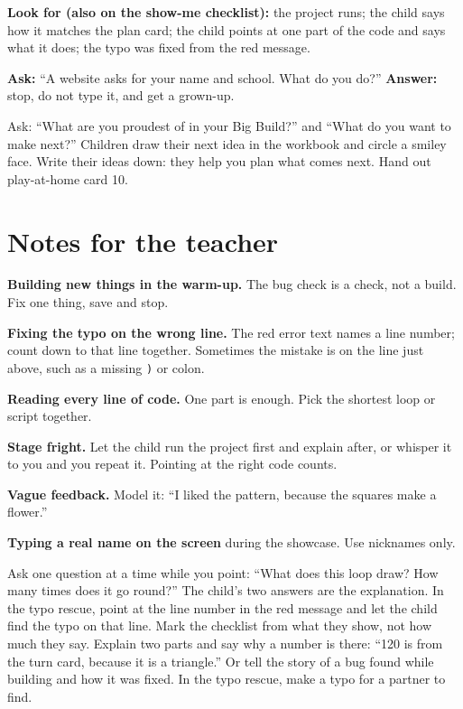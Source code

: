 \begin{formativecheck}
\textbf{Look for (also on the show-me checklist):} the project runs; the child says how it matches the plan card; the child points at one part of the code and says what it does; the typo was fixed from the red message.

\textbf{Ask:} \enquote{A website asks for your name and school. What do you do?}
\textbf{Answer:} stop, do not type it, and get a grown-up.
\end{formativecheck}

\begin{reflection}
Ask: \enquote{What are you proudest of in your Big Build?} and \enquote{What do you want to make next?} Children draw their next idea in the workbook and circle a smiley face. Write their ideas down: they help you plan what comes next. Hand out play-at-home card 10.
\end{reflection}

\section{Notes for the teacher}
\begin{commonmistakes}
  \item \textbf{Building new things in the warm-up.} The bug check is a check, not a build. Fix one thing, save and stop.
  \item \textbf{Fixing the typo on the wrong line.} The red error text names a line number; count down to that line together. Sometimes the mistake is on the line just above, such as a missing \texttt{)} or colon.
  \item \textbf{Reading every line of code.} One part is enough. Pick the shortest loop or script together.
  \item \textbf{Stage fright.} Let the child run the project first and explain after, or whisper it to you and you repeat it. Pointing at the right code counts.
  \item \textbf{Vague feedback.} Model it: \enquote{I liked the pattern, because the squares make a flower.}
  \item \textbf{Typing a real name on the screen} during the showcase. Use nicknames only.
\end{commonmistakes}

\begin{differentiation}
\supportpath Ask one question at a time while you point: \enquote{What does this loop draw? How many times does it go round?} The child's two answers are the explanation. In the typo rescue, point at the line number in the red message and let the child find the typo on that line. Mark the checklist from what they show, not how much they say.
\extensionpath Explain two parts and say why a number is there: \enquote{120 is from the turn card, because it is a triangle.} Or tell the story of a bug found while building and how it was fixed. In the typo rescue, make a typo for a partner to find.
\end{differentiation}


